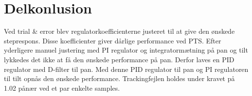 \section{Delkonlusion}
Ved trial \& error blev regulatorkoefficienterne justeret til at give den ønskede 
steprespons. Disse koefficienter giver dårlige performance ved PTS. 
Efter yderligere manuel justering med PI regulator og integratormætning på pan og tilt lykkedes 
det ikke at få den ønskede performance på pan. 
Derfor laves en PID regulator med D-filter til pan. Med denne PID regulator til pan og 
PI regulatoren til tilt opnås den ønskede performance. 
Trackingfejlen holdes under kravet på 1.02 \degree pånær ved et par enkelte 
samples.
